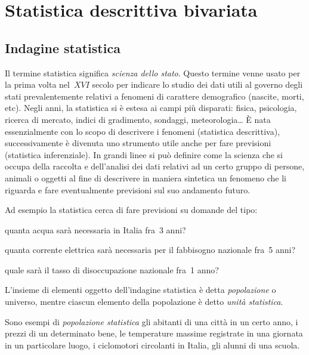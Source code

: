 
\chapter{Statistica descrittiva bivariata}

\section{Indagine statistica}
\label{sec:stat02_indagine}

Il termine statistica significa \emph{scienza dello stato}. Questo termine 
venne usato per la prima volta nel~\(XVI\) secolo
per indicare lo studio dei dati utili al governo degli stati 
prevalentemente relativi a fenomeni di carattere demografico (nascite, 
morti, etc).
Negli anni, la statistica si è estesa ai campi più disparati: fisica, 
psicologia, ricerca di mercato, indici di gradimento, sondaggi, 
meteorologia\ldots
È nata essenzialmente con lo scopo di descrivere i fenomeni (statistica 
descrittiva), successivamente è divenuta uno strumento utile
anche per fare previsioni (statistica inferenziale). In grandi linee si può 
definire come la scienza che si occupa della raccolta e dell'analisi dei 
dati relativi
ad un certo gruppo di persone, animali o oggetti al fine di descrivere in 
maniera sintetica un fenomeno che li riguarda e fare eventualmente 
previsioni sul suo andamento futuro.

Ad esempio la statistica cerca di fare previsioni su domande del tipo:
\begin{itemize*}
\item quanta acqua sarà necessaria in Italia fra~3 anni?
\item quanta corrente elettrica sarà necessaria per il fabbisogno nazionale 
fra~5 anni?
\item quale sarà il tasso di disoccupazione nazionale fra~1 anno?
\end{itemize*}

\begin{definizione}
L'insieme di elementi oggetto dell'indagine statistica è detta 
\emph{popolazione} o universo, mentre ciascun elemento della popolazione è 
detto \emph{unità statistica}.
\end{definizione}

Sono esempi di \emph{popolazione statistica} gli abitanti di una città in 
un certo anno, i prezzi di un determinato bene, le temperature massime 
registrate
in una giornata in un particolare luogo, i ciclomotori circolanti in 
Italia, gli alunni di una scuola.


